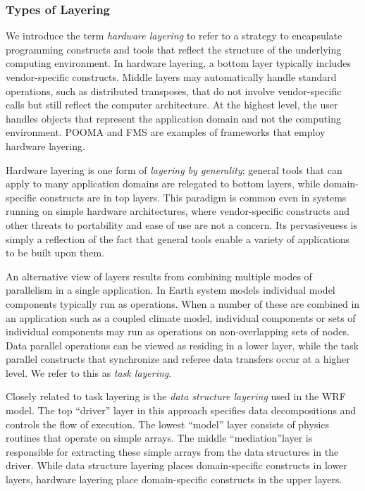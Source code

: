 \subsubsection{Types of Layering}
\label{sec:layering}

We introduce the term {\it hardware layering} to refer to a strategy to encapsulate 
programming constructs and tools that reflect the structure of the underlying 
computing environment.  In hardware layering, a bottom layer typically includes 
vendor-specific constructs.  Middle layers may automatically 
handle standard operations, such as distributed transposes, that do not involve  
vendor-specific calls but still reflect the computer architecture.  At the highest
level, the user handles objects that represent the application 
domain and not the computing environment.  POOMA \cite{pooma} and FMS \cite{fms} are examples of frameworks
that employ hardware layering.  

Hardware layering is one form of {\it layering by generality}; general 
tools that can apply to many application domains are relegated to bottom layers, 
while domain-specific constructs are in top layers.  This paradigm is
common even in systems running on simple hardware architectures, where 
vendor-specific
constructs and other threats to portability and ease of use are not a concern.
Its pervasiveness is simply a reflection of the fact that general tools 
enable a variety of applications to be built upon them.

An alternative view of layers results from combining multiple modes of parallelism 
in a single application.  In Earth system models individual model 
components typically run as  
operations.  When a number of 
these are combined in an application such as a coupled climate model, individual 
components or sets of individual components may run as  operations 
on non-overlapping sets of nodes.  Data parallel operations can be viewed
as residing in a lower layer, while the task parallel constructs that 
synchronize and referee data transfers occur at a higher level. We refer to 
this as {\it task layering}.

Closely related to task layering is the {\it data structure layering} used 
in the WRF model.  The top ``driver'' layer 
in this approach specifies data decompositions and controls
the flow of execution.  The lowest ``model'' layer consists of physics routines that
operate on simple arrays.  The middle ``mediation''layer is responsible for 
extracting these simple arrays from the data structures in the driver.
While data structure layering places domain-specific constructs in lower layers, hardware 
layering place domain-specific constructs in the upper layers.  


